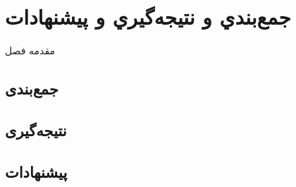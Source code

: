 \chapter{جمع‌بندي و نتيجه‌گيري و پیشنهادات}
مقدمه فصل

\section{جمع‌بندی}
\section{نتیجه‌گیری}
\section{پیشنهادات}